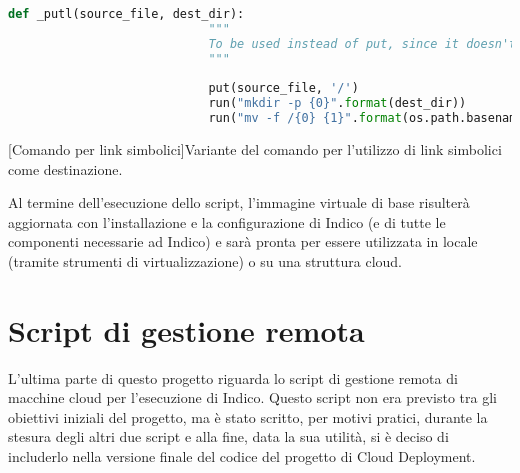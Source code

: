             \begin{center}
                \begin{minipage}{\linewidth}
                    \begin{lstlisting}[language=python, gobble=22]
                        def _putl(source_file, dest_dir):
                            """
                            To be used instead of put, since it doesn't support symbolic links
                            """
                        
                            put(source_file, '/')
                            run("mkdir -p {0}".format(dest_dir))
                            run("mv -f /{0} {1}".format(os.path.basename(source_file), dest_dir))
                    \end{lstlisting}
                    \captionsetup{textformat=empty,labelformat=empty} \vspace{-2em}
                    [Comando  per link simbolici]{Variante del comando  per l'utilizzo di link simbolici come destinazione.}
                \end{minipage}
            \end{center}
            
            Al termine dell'esecuzione dello script, l'immagine virtuale di base risulterà aggiornata con l'installazione e la configurazione di Indico (e di tutte le componenti necessarie ad Indico) e sarà pronta per essere utilizzata in locale (tramite strumenti di virtualizzazione) o su una struttura cloud.
    
    \section{Script di gestione remota} \label{sec:cd;script_gestione_remota}
    
        L'ultima parte di questo progetto riguarda lo script di gestione remota di macchine cloud per l'esecuzione di Indico. Questo script non era previsto tra gli obiettivi iniziali del progetto, ma è stato scritto, per motivi pratici, durante la stesura degli altri due script e alla fine, data la sua utilità, si è deciso di includerlo nella versione finale del codice del progetto di Cloud Deployment.
        

